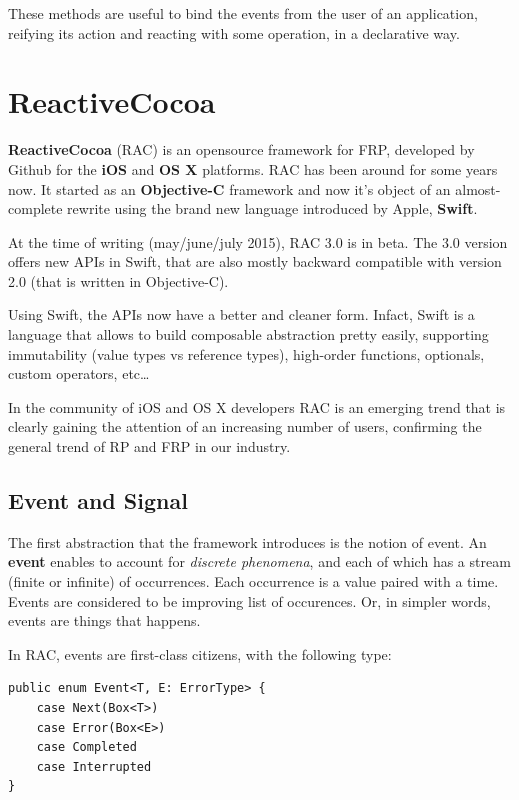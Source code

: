 These methods are useful to bind the events from the user of an
application, reifying its action and reacting with some operation, in a
declarative way.

\section{ReactiveCocoa}\label{reactivecocoa}

\textbf{ReactiveCocoa} (RAC) is an opensource framework for FRP,
developed by Github for the \textbf{iOS} and \textbf{OS X} platforms.
RAC has been around for some years now. It started as an
\textbf{Objective-C} framework and now it's object of an almost-complete
rewrite using the brand new language introduced by Apple,
\textbf{Swift}.

At the time of writing (may/june/july 2015), RAC 3.0 is in beta. The 3.0
version offers new APIs in Swift, that are also mostly backward
compatible with version 2.0 (that is written in Objective-C).

Using Swift, the APIs now have a better and cleaner form. Infact, Swift
is a language that allows to build composable abstraction pretty easily,
supporting immutability (value types vs reference types), high-order
functions, optionals, custom operators, etc\ldots{}

In the community of iOS and OS X developers RAC is an emerging trend
that is clearly gaining the attention of an increasing number of users,
confirming the general trend of RP and FRP in our industry.


\subsection{Event and Signal}\label{event-and-signal}

The first abstraction that the framework introduces is the notion of
event. An \textbf{event} enables to account for \emph{discrete
phenomena}, and each of which has a stream (finite or infinite) of
occurrences. Each occurrence is a value paired with a time.
Events are considered to be improving list of occurences. Or, in simpler
words, events are things that happens.

In RAC, events are first-class citizens, with the following type:

\begin{verbatim}
public enum Event<T, E: ErrorType> {
    case Next(Box<T>)
    case Error(Box<E>)
    case Completed
    case Interrupted
}
\end{verbatim}


